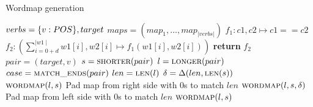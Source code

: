 \algrenewcommand{}
\algrenewcommand{}
\begin{algorithm}
    \caption{Wordmap generation}\label{alg:wordmap}
    \begin{algorithmic}[1]
        \Require $verbs = \{v : \uppercase{POS}\}, target$ 
        \Ensure $maps = (map_{1}, \ldots, map_{|verbs|})$
            \State $f_{1}: c1, c2 \mapsto c1 == c2$
            \State $f_{2}: \left(\sum_{i=0+d}^{\mid w1 \mid} w1[i], w2[i] \mapsto f_{1}(w1[i], w2[i])\right)$
            \State \textbf{return} $f_{2}$
        \EndFunction
        \\

        \State $pair = (target, v)$
        \State $s = \textsc{shorter}(pair)$
        \State $l = \textsc{longer}(pair)$
        \State $case = \textsc{match\_ends}(pair)$ 
        \State $len = \textsc{len}(l)$
        \State $\delta = \Delta(len, \textsc{len}(s))$
        \\

            \If{$\delta$}
                        \State $\textsc{wordmap}(l, s)$
                    \State Pad map from right side with 0s to match $len$
                \EndIf
                        \State $\textsc{wordmap}(l, s, \delta)$
                    \State Pad map from left side with 0s to match $len$
                \EndIf
            \Else
                \State $\textsc{wordmap}(l, s)$
            \EndIf
        \EndIf
        \EndFor

    \end{algorithmic}
\end{algorithm}



